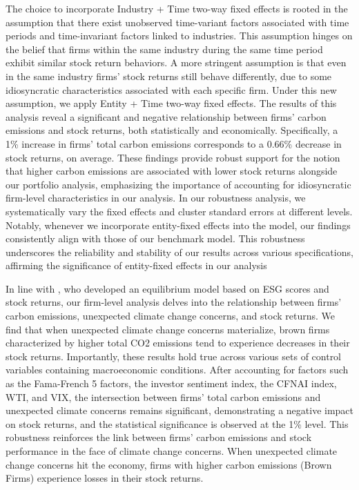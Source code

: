 \documentclass[12pt]{article}
\begin{document}
The choice to incorporate Industry + Time two-way fixed effects is rooted in the assumption that there exist unobserved time-variant factors associated with time periods and time-invariant factors linked to industries. This assumption hinges on the belief that firms within the same industry during the same time period exhibit similar stock return behaviors. A more stringent assumption is that even in the same industry firms' stock returns still behave differently, due to some idiosyncratic characteristics associated with each specific firm. Under this new assumption, we apply Entity + Time two-way fixed effects. The results of this analysis reveal a significant and negative relationship between firms' carbon emissions and stock returns, both statistically and economically. Specifically, a 1\% increase in firms' total carbon emissions corresponds to a 0.66\% decrease in stock returns, on average. These findings provide robust support for the notion that higher carbon emissions are associated with lower stock returns alongside our portfolio analysis, emphasizing the importance of accounting for idiosyncratic firm-level characteristics in our analysis. In our robustness analysis, we systematically vary the fixed effects and cluster standard errors at different levels. Notably, whenever we incorporate entity-fixed effects into the model, our findings consistently align with those of our benchmark model. This robustness underscores the reliability and stability of our results across various specifications, affirming the significance of entity-fixed effects in our analysis

In line with \cite{pastor2021sustainable}, who developed an equilibrium model based on ESG scores and stock returns, our firm-level analysis delves into the relationship between firms' carbon emissions, unexpected climate change concerns, and stock returns. We find that when unexpected climate change concerns materialize, brown firms characterized by higher total CO2 emissions tend to experience decreases in their stock returns. Importantly, these results hold true across various sets of control variables containing macroeconomic conditions. After accounting for factors such as the Fama-French 5 factors, the investor sentiment index, the CFNAI index, WTI, and VIX, the intersection between firms' total carbon emissions and unexpected climate concerns remains significant, demonstrating a negative impact on stock returns, and the statistical significance is observed at the 1\% level. This robustness reinforces the link between firms' carbon emissions and stock performance in the face of climate change concerns. When unexpected climate change concerns hit the economy, firms with higher carbon emissions (Brown Firms) experience losses in their stock returns. 
\end{document}
